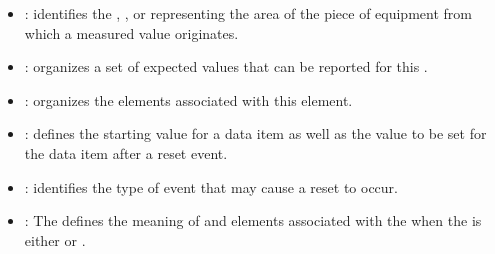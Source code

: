 \begin{itemize}
\item {} :  identifies the , , or  representing the area of the piece of equipment from which a measured value originates.
\item {} :  \glspl{organize} a set of expected values that can be reported for this .
\item {} :  \glspl{organize} the  elements associated with this  element. 
\item {} :  defines the starting value for a data item as well as the value to be set for the data item after a reset event.
\item {} :  identifies the type of event that may cause a reset to occur.
\item {} : The  defines the meaning of  and  elements associated with the  when the  is either  or .
\end{itemize}
\FloatBarrier
